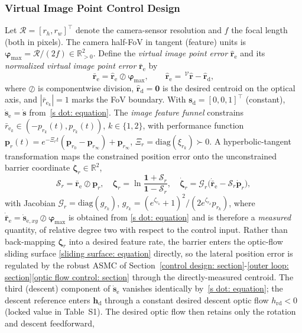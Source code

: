\subsubsection{Virtual Image Point Control Design} \label{virtual image point control: section}
Let $\mathcal{R}=[r_h,r_w]^\top$ denote the camera-sensor resolution and $f$ the focal length (both in pixels). The camera half-FoV in tangent (feature) units is $\boldsymbol{\varphi}_\text{max}=\mathcal{R}/(2f)\in\mathbb{R}^2_{>0}$. Define the \emph{virtual image point error} $\hat{\boldsymbol{r}}_\text{e}$ and its \emph{normalized virtual image point error} $\bar{\boldsymbol{r}}_\text{e}$ by
\begin{equation} \label{normalized error: equation}
    \bar{\boldsymbol{r}}_\text{e} = \hat{\boldsymbol{r}}_\text{e}\oslash\boldsymbol{\varphi}_\text{max},\qquad\hat{\boldsymbol{r}}_\text{e}=\,^\mathcal{V}\hat{\boldsymbol{r}}-\hat{\boldsymbol{r}}_\text{d},
\end{equation}
where $\oslash$ is componentwise division, $\hat{\boldsymbol{r}}_\text{d}=\boldsymbol{0}$ is the desired centroid on the optical axis, and $|\bar{r}_{\text{e}_k}|=1$ marks the FoV boundary. With $\boldsymbol{s}_\text{d}=[0,0,1]^\top$ (constant), $\dot{\boldsymbol{s}}_\text{e}=\dot{\boldsymbol{s}}$ from~\eqref{s dot: equation}. The \emph{image feature funnel} constrains $\bar{r}_{\text{e}_k}\in(-p_{r_k}(t),p_{r_k}(t))$, $k\in\{1,2\}$, with performance function $\boldsymbol{p}_r(t)=e^{-\Xi_r t}(\boldsymbol{p}_{r_0}-\boldsymbol{p}_{r_\infty})+\boldsymbol{p}_{r_\infty}$, $\Xi_r=\text{diag}(\xi_{r_k})\succ 0$. A hyperbolic-tangent transformation maps the constrained position error onto the unconstrained barrier coordinate $\boldsymbol{\zeta}_r\in\mathbb{R}^2$,
\begin{equation} \label{position barrier: equation}
    \mathcal{S}_r = \bar{\boldsymbol{r}}_\text{e}\oslash\boldsymbol{p}_r,\quad \boldsymbol{\zeta}_r = \ln\frac{\boldsymbol{1}+\mathcal{S}_r}{\boldsymbol{1}-\mathcal{S}_r},\quad \dot{\boldsymbol{\zeta}}_r = \mathcal{G}_r\big(\dot{\bar{\boldsymbol{r}}}_\text{e}-\mathcal{S}_r\dot{\boldsymbol{p}}_r\big),
\end{equation}
with Jacobian $\mathcal{G}_r=\text{diag}(g_{r_k})$, $g_{r_k}=(e^{\zeta_{r_k}}+1)^2/(2e^{\zeta_{r_k}}p_{r_k})$, where $\dot{\bar{\boldsymbol{r}}}_\text{e}=\dot{\boldsymbol{s}}_{\text{e},xy}\oslash\boldsymbol{\varphi}_\text{max}$ is obtained from \eqref{s dot: equation} and is therefore a \emph{measured} quantity, of relative degree two with respect to the control input. Rather than back-mapping $\boldsymbol{\zeta}_r$ into a desired feature rate, the barrier enters the optic-flow sliding surface \eqref{sliding surface: equation} directly, so the lateral position error is regulated by the robust ASMC of Section~\ref{control design: section}-\ref{outer loop: section}\ref{optic flow control: section} through the directly-measured centroid. The third (descent) component of $\dot{\boldsymbol{s}}_\text{e}$ vanishes identically by~\eqref{s dot: equation}; the descent reference enters $\boldsymbol{h}_\text{d}$ through a constant desired descent optic flow $h_\text{rd}<0$ (locked value in Table~S1). The desired optic flow then retains only the rotation and descent feedforward,
